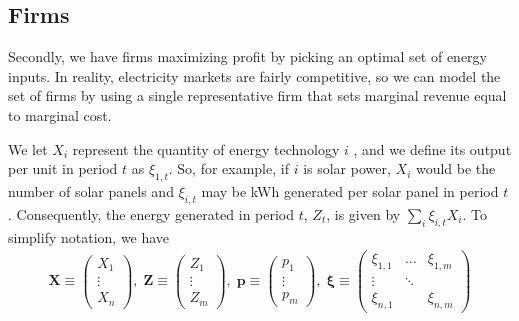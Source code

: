 \documentclass[11pt,a4paper,leqno]{extarticle}
\begin{document}
	\subsection{Firms}
	
	Secondly, we have firms maximizing profit by picking an optimal set of energy inputs. In reality, electricity markets are fairly competitive, so we can model the set of firms by using a single representative firm that sets marginal revenue equal to marginal cost. 
	
	We let $X_i$  represent the quantity of energy technology $i$ , and we define its output per unit in period $t$ as $\xi_{1,t}$. So, for example, if $i$ is solar power, $X_i$ would be the number of solar panels and $\xi_{i,t}$ may be kWh generated per solar panel in period $t$. Consequently, the energy generated in period $t$, $Z_t$, is given by $\sum_i \xi_{i,t} X_i$. To simplify notation, we have
	\begin{align*}
	\mathbf{X} \equiv \begin{pmatrix}
	X_1\\
	\vdots\\
	X_n
	\end{pmatrix} ,\;
	\mathbf{Z} \equiv \begin{pmatrix}
	Z_1\\
	\vdots\\
	Z_m
	\end{pmatrix} ,\;
	\mathbf{p} \equiv \begin{pmatrix}
	p_1\\
	\vdots\\
	p_m
	\end{pmatrix} ,\;
	\boldsymbol{\xi} \equiv \begin{pmatrix}
	\xi_{1,1} & \dots & \xi_{1,m}\\
	\vdots & \ddots & \\
	\xi_{n,1} &  & \xi_{n,m}
	\end{pmatrix} 
	\end{align*}
\end{document}
